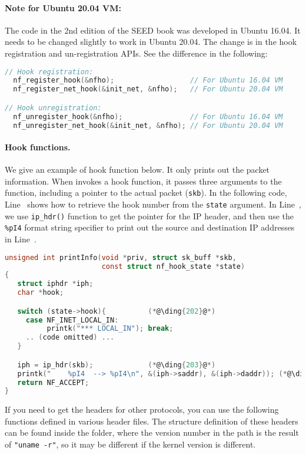 \paragraph{Note for Ubuntu 20.04 VM:}
The code in the 2nd edition of the SEED book was developed 
in Ubuntu 16.04. It needs to be changed slightly 
to work in Ubuntu 20.04. The change is in the hook registration and 
un-registration APIs. See the difference in the following:

\begin{lstlisting}[language=C]
// Hook registration:
  nf_register_hook(&nfho);                  // For Ubuntu 16.04 VM
  nf_register_net_hook(&init_net, &nfho);   // For Ubuntu 20.04 VM

// Hook unregistration:
  nf_unregister_hook(&nfho);                // For Ubuntu 16.04 VM
  nf_unregister_net_hook(&init_net, &nfho); // For Ubuntu 20.04 VM
\end{lstlisting}
 

\paragraph{Hook functions.} We give an example of hook function
below. It only prints out the packet information.
When \netfilter invokes a hook function, it passes
three arguments to the function, including a pointer to the 
actual packet (\texttt{skb}). 
In the following code, Line~ shows how to retrieve 
the hook number from the \texttt{state} argument. 
In Line~, we use \texttt{ip\_hdr()} function
to get the pointer for the IP header,
and then use the \texttt{\%pI4} format string specifier
to print out the source and destination 
IP addresses in Line~.

\begin{lstlisting}[language=C, caption={An example of hook function}]
unsigned int printInfo(void *priv, struct sk_buff *skb,   
                       const struct nf_hook_state *state)
{
   struct iphdr *iph;
   char *hook;

   switch (state->hook){          (*@\ding{202}@*)
     case NF_INET_LOCAL_IN: 
          printk("*** LOCAL_IN"); break;
     .. (code omitted) ...
   }

   iph = ip_hdr(skb);             (*@\ding{203}@*)           
   printk("    %pI4  --> %pI4\n", &(iph->saddr), &(iph->daddr)); (*@\ding{204}@*)
   return NF_ACCEPT;
}
\end{lstlisting}

If you need to get the headers for other protocols, you can use the following
functions defined in various header files. The  
structure definition of these headers can be found 
inside the  
folder, where the version number in the path is the result 
of \texttt{"uname -r"}, so it may be different if the kernel version
is different. 

